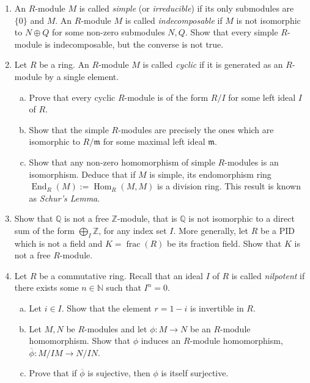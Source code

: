 \documentclass[12pt,
psamsfonts]{amsart}
\theoremstyle{remark}
\theoremstyle{definition}
\newcommand{\N}{\mathbb{N}\xspace}
\newcommand{\Z}{\mathbb{Z}\xspace}
\newcommand{\Q}{\mathbb{Q}\xspace}
\DeclareMathOperator{\Hom}{Hom}
\DeclareMathOperator{\End}{End}
\DeclareMathOperator{\fr}{frac}
\numberwithin{equation}{section}
\begin{document}
\begin{enumerate}
\item An $R$-module $M$ is called \textit{simple} (or \textit{irreducible}) if its only submodules are $\{0\}$ and $M$. An $R$-module $M$ is called \textit{indecomposable} if $M$ is not isomorphic to $N\oplus Q$ for some non-zero submodules $N,Q$. Show that every simple $R$-module is indecomposable, but the converse is not true.  
\item Let $R$ be a ring. An $R$-module $M$ is called \textit{cyclic} if it is generated as an $R$-module by a single element. 
\begin{enumerate}
[(a)]\item Prove that every cyclic $R$-module is of the form $R/I$ for some left ideal $I$ of $R$. 
\item Show that the simple $R$-modules are precisely the ones which are isomorphic to $R/\mathfrak{m}$ for some maximal left ideal $\mathfrak{m}$. 
\item Show that any non-zero homomorphism of simple $R$-modules is an isomorphism. Deduce that if $M$ is simple, its endomorphism ring $\End_R(M):=\Hom_R(M,M)$ is a division ring. This result is known as \textit{Schur's Lemma}. 
\end{enumerate}
\item Show that $\Q$ is not a free $\Z$-module, that is $\Q$ is not isomorphic to a direct sum of the form $\displaystyle\bigoplus_I \Z$, for any index set $I$. More generally, let $R$ be a PID which is not a field and $K=\fr(R)$ be its fraction field. Show that $K$ is not a free $R$-module. 
\item Let $R$ be a commutative ring. Recall that an ideal $I$ of $R$ is called \textit{nilpotent} if there exists some $n\in\N$ such that $I^n=0$. 
\begin{enumerate}
[(a)]\item Let $i\in I$. Show that the element $r=1-i$ is invertible in $R$. 
\item Let $M,N$ be $R$-modules and let $\phi:M\rightarrow N$ be an $R$-module homomorphism. Show that $\phi$ induces an $R$-module homomorphism, $\overline{\phi}:M/IM\rightarrow N/IN$. 
\item Prove that if $\overline{\phi}$ is sujective, then $\phi$ is itself surjective. 
\end{enumerate}




\end{enumerate}
\bigskip
\end{document}

